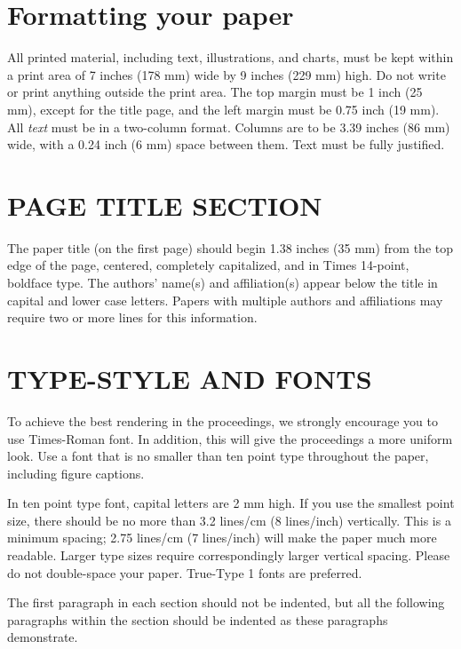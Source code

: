\documentclass{article}
\begin{document}
\section{Formatting your paper}
\label{sec:format}

All printed material, including text, illustrations, and charts, must be kept
within a print area of 7 inches (178 mm) wide by 9 inches (229 mm) high. Do
not write or print anything outside the print area. The top margin must be 1
inch (25 mm), except for the title page, and the left margin must be 0.75 inch
(19 mm).  All {\it text} must be in a two-column format. Columns are to be 3.39
inches (86 mm) wide, with a 0.24 inch (6 mm) space between them. Text must be
fully justified.

\section{PAGE TITLE SECTION}
\label{sec:pagestyle}

The paper title (on the first page) should begin 1.38 inches (35 mm) from the
top edge of the page, centered, completely capitalized, and in Times 14-point,
boldface type.  The authors' name(s) and affiliation(s) appear below the title
in capital and lower case letters.  Papers with multiple authors and
affiliations may require two or more lines for this information.

\section{TYPE-STYLE AND FONTS}
\label{sec:typestyle}

To achieve the best rendering in the proceedings, we
strongly encourage you to use Times-Roman font.  In addition, this will give
the proceedings a more uniform look.  Use a font that is no smaller than ten
point type throughout the paper, including figure captions.

In ten point type font, capital letters are 2 mm high.  If you use the
smallest point size, there should be no more than 3.2 lines/cm (8 lines/inch)
vertically.  This is a minimum spacing; 2.75 lines/cm (7 lines/inch) will make
the paper much more readable.  Larger type sizes require correspondingly larger
vertical spacing.  Please do not double-space your paper.  True-Type 1 fonts
are preferred.

The first paragraph in each section should not be indented, but all the
following paragraphs within the section should be indented as these paragraphs
demonstrate.
\end{document}
